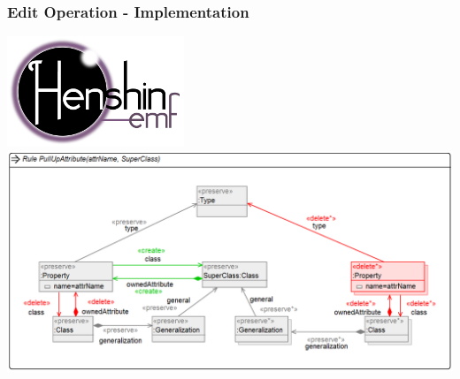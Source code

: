 
\begin{frame}
  \frametitle{Edit Operation - Implementation}
  \begin{center}
  \includegraphics[scale=2.0]{images/henshinLogo}\\
  \includegraphics[scale=0.3]{images/pullUp_HR}
  \end{center}
\end{frame}

